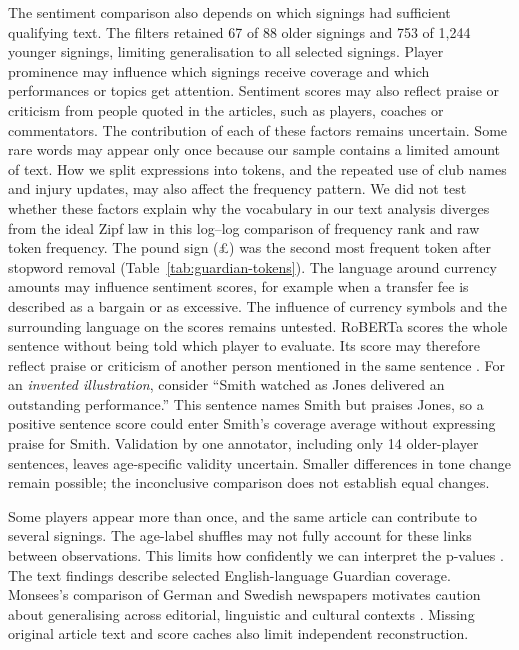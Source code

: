 The sentiment comparison also depends on which signings had sufficient qualifying text. The filters retained 67 of 88 older signings and 753 of 1,244 younger signings, limiting generalisation to all selected signings. Player prominence may influence which signings receive coverage and which performances or topics get attention. Sentiment scores may also reflect praise or criticism from people quoted in the articles, such as players, coaches or commentators. The contribution of each of these factors remains uncertain. Some rare words may appear only once because our sample contains a limited amount of text. How we split expressions into tokens, and the repeated use of club names and injury updates, may also affect the frequency pattern. We did not test whether these factors explain why the vocabulary in our text analysis diverges from the ideal Zipf law in this log--log comparison of frequency rank and raw token frequency. The pound sign (\pounds{}) was the second most frequent token after stopword removal (Table~\ref{tab:guardian-tokens}). The language around currency amounts may influence sentiment scores, for example when a transfer fee is described as a bargain or as excessive. The influence of currency symbols and the surrounding language on the scores remains untested. RoBERTa scores the whole sentence without being told which player to evaluate. Its score may therefore reflect praise or criticism of another person mentioned in the same sentence \cite{hamborg2021news}. For an \textit{invented illustration}, consider ``Smith watched as Jones delivered an outstanding performance.'' This sentence names Smith but praises Jones, so a positive sentence score could enter Smith's coverage average without expressing praise for Smith. Validation by one annotator, including only 14 older-player sentences, leaves age-specific validity uncertain. Smaller differences in tone change remain possible; the inconclusive comparison does not establish equal changes.

Some players appear more than once, and the same article can contribute to several signings. The age-label shuffles may not fully account for these links between observations. This limits how confidently we can interpret the p-values \cite{hemerik2018exact,winkler2015multilevel}. The text findings describe selected English-language Guardian coverage. Monsees's comparison of German and Swedish newspapers motivates caution about generalising across editorial, linguistic and cultural contexts \cite{monsees2024talent}. Missing original article text and score caches also limit independent reconstruction.
